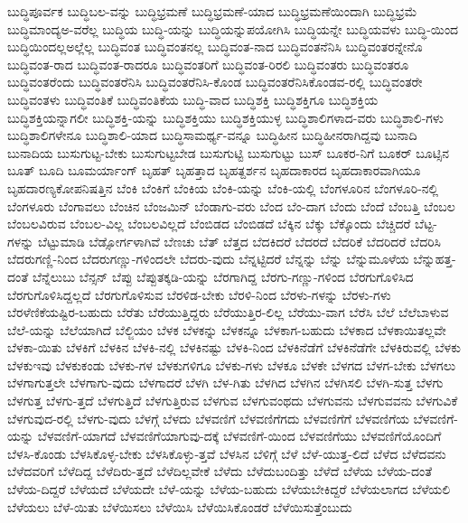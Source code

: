 {ಬುದ್ಧಿಪೂರ್ವಕ
ಬುದ್ಧಿಬಲ-ವನ್ನು
ಬುದ್ಧಿಭ್ರಮಣೆ
ಬುದ್ಧಿಭ್ರಮಣೆ-ಯಾದ
ಬುದ್ಧಿಭ್ರಮಣೆಯಿಂದಾಗಿ
ಬುದ್ಧಿಭ್ರಮೆ
ಬುದ್ಧಿಮಾಂದ್ಯಅ-ವರೆಲ್ಲ
ಬುದ್ಧಿಯ
ಬುದ್ಧಿ-ಯನ್ನು
ಬುದ್ಧಿಯನ್ನುಪಯೋಗಿಸಿ
ಬುದ್ಧಿಯನ್ನೇ
ಬುದ್ಧಿಯವಳು
ಬುದ್ಧಿ-ಯಿಂದ
ಬುದ್ಧಿಯಿಂದಲ್ಲಅಲ್ಲೆಲ್ಲ
ಬುದ್ಧಿವಂತ
ಬುದ್ಧಿವಂತನಲ್ಲ
ಬುದ್ಧಿವಂತ-ನಾದ
ಬುದ್ಧಿವಂತನೆನಿಸಿ
ಬುದ್ಧಿವಂತರನ್ನೇನೊ
ಬುದ್ಧಿವಂತ-ರಾದ
ಬುದ್ಧಿವಂತ-ರಾದರೂ
ಬುದ್ಧಿವಂತರಿಗೆ
ಬುದ್ಧಿವಂತ-ರಿರಲಿ
ಬುದ್ಧಿವಂತರು
ಬುದ್ಧಿವಂತರೂ
ಬುದ್ಧಿವಂತರೆಂದು
ಬುದ್ಧಿವಂತರೆನಿಸಿ
ಬುದ್ಧಿವಂತರೆನಿಸಿ-ಕೊಂಡ
ಬುದ್ಧಿವಂತರೆನಿಸಿಕೊಂಡವ-ರಲ್ಲಿ
ಬುದ್ಧಿವಂತರೇ
ಬುದ್ಧಿವಂತಳು
ಬುದ್ಧಿವಂತಿಕೆ
ಬುದ್ಧಿವಂತಿಕೆಯ
ಬುದ್ಧಿ-ವಾದ
ಬುದ್ಧಿಶಕ್ತಿ
ಬುದ್ಧಿಶಕ್ತಿಗೂ
ಬುದ್ಧಿಶಕ್ತಿಯ
ಬುದ್ಧಿಶಕ್ತಿಯನ್ನಾಗಲೀ
ಬುದ್ಧಿಶಕ್ತಿ-ಯನ್ನು
ಬುದ್ಧಿಶಕ್ತಿಯು
ಬುದ್ಧಿಶಕ್ತಿಯುಳ್ಳ
ಬುದ್ಧಿಶಾಲಿಗಳಾದ-ವರು
ಬುದ್ಧಿಶಾಲಿ-ಗಳು
ಬುದ್ಧಿಶಾಲಿಗಳೇನೂ
ಬುದ್ಧಿಶಾಲಿ-ಯಾದ
ಬುದ್ಧಿಸಾಮರ್ಥ್ಯ-ವನ್ನೂ
ಬುದ್ಧಿಹೀನ
ಬುದ್ಧಿಹೀನರಾಗಿದ್ದವು
ಬುನಾದಿ
ಬುನಾದಿಯ
ಬುಸುಗುಟ್ಟ-ಬೇಕು
ಬುಸುಗುಟ್ಟಬೇಡ
ಬುಸುಗುಟ್ಟಿ
ಬುಸುಗುಟ್ಟು
ಬುಸ್
ಬೂಕರ-ನಿಗೆ
ಬೂಕರ್
ಬೂಟ್ಸಿನ
ಬೂತ್
ಬೂದಿ
ಬೂಮರ್ಯಾಂಗ್
ಬೃಹತ್
ಬೃಹತ್ತಾದ
ಬೃಹತ್ದರ್ಶನ
ಬೃಹದಾಕಾರದ
ಬೃಹದಾಕಾರವಾಗಿಯೂ
ಬೃಹದಾರಣ್ಯಕೋಪನಿಷತ್ತಿನ
ಬೆಂಕಿ
ಬೆಂಕಿಗೆ
ಬೆಂಕಿಯ
ಬೆಂಕಿ-ಯನ್ನು
ಬೆಂಕಿ-ಯಲ್ಲಿ
ಬೆಂಗಳೂರಿನ
ಬೆಂಗಳೂರಿ-ನಲ್ಲಿ
ಬೆಂಗಳೂರು
ಬೆಂಗಾವಲು
ಬೆಂಚಿನ
ಬೆಂಜಮಿನ್
ಬೆಂಡಾಗು-ವರು
ಬೆಂದ
ಬೆಂ-ದಾಗ
ಬೆಂದು
ಬೆಂದೆ
ಬೆಂಬತ್ತಿ
ಬೆಂಬಲ
ಬೆಂಬಲವಿರುವ
ಬೆಂಬಲ-ವಿಲ್ಲ
ಬೆಂಬಲವಿಲ್ಲದೆ
ಬೆಂಬಿಡದ
ಬೆಂಬಿಡದೆ
ಬೆಕ್ಕಿನ
ಬೆಕ್ಕು
ಬೆಕ್ಕೊಂದು
ಬೆಚ್ಚಿದರೆ
ಬೆಟ್ಟ-ಗಳನ್ನು
ಬೆಟ್ಟುಮಾಡಿ
ಬೆಡ್ಸೋರ್ಗಳಾಗಿವೆ
ಬೆಣಚು
ಬೆತ್
ಬೆತ್ತದ
ಬೆದಕಿದರೆ
ಬೆದರದೆ
ಬೆದರಿಕೆ
ಬೆದರಿದರೆ
ಬೆದರಿಸಿ
ಬೆದರುಗಣ್ಣಿ-ನಿಂದ
ಬೆದರುಗಣ್ಣು-ಗಳಿಂದಲೇ
ಬೆದರು-ವುದು
ಬೆನ್ನಟ್ಟಿದರೆ
ಬೆನ್ನನ್ನು
ಬೆನ್ನು
ಬೆನ್ನುಮೂಳೆಯ
ಬೆನ್ನುಹತ್ತ-ದಂತೆ
ಬೆನ್ನೆಲುಬು
ಬೆನ್ಸನ್
ಬೆಪ್ಪು
ಬೆಪ್ಪುತಕ್ಕಡಿ-ಯನ್ನು
ಬೆರಗಾಗಿದ್ದ
ಬೆರಗು-ಗಣ್ಣು-ಗಳಿಂದ
ಬೆರಗುಗೊಳಿಸಿದ
ಬೆರಗುಗೊಳಿಸಿದ್ದಲ್ಲದೆ
ಬೆರಗುಗೊಳಿಸುವ
ಬೆರಳಿಡ-ಬೇಕು
ಬೆರಳಿ-ನಿಂದ
ಬೆರಳು-ಗಳನ್ನು
ಬೆರಳು-ಗಳು
ಬೆರಳೆಣಿಕೆಯಷ್ಟಿರ-ಬಹುದು
ಬೆರೆತು
ಬೆರೆಯುತ್ತಿದ್ದರು
ಬೆರೆಯುತ್ತಿರ-ಲಿಲ್ಲ
ಬೆರೆಯು-ವಾಗ
ಬೆರೆಸಿ
ಬೆಲೆ
ಬೆಲೆಬಾಳುವ
ಬೆಲೆ-ಯನ್ನು
ಬೆಲೆಯಾಗಿದೆ
ಬೆಲ್ಜಿಯಂ
ಬೆಳಕ
ಬೆಳಕನ್ನು
ಬೆಳಕನ್ನೂ
ಬೆಳಕಾಗ-ಬಹುದು
ಬೆಳಕಾದ
ಬೆಳಕಾಯಿತಲ್ಲವೇ
ಬೆಳಕಾ-ಯಿತು
ಬೆಳಕಿಗೆ
ಬೆಳಕಿನ
ಬೆಳಕಿ-ನಲ್ಲಿ
ಬೆಳಕಿನಷ್ಟು
ಬೆಳಕಿ-ನಿಂದ
ಬೆಳಕಿನೆಡೆಗೆ
ಬೆಳಕಿನೆಡೆಗೇ
ಬೆಳಕಿರುವಲ್ಲಿ
ಬೆಳಕು
ಬೆಳಕುಇವು
ಬೆಳಕುಕಂಡು
ಬೆಳಕು-ಗಳ
ಬೆಳಕುಗಳಿಗೂ
ಬೆಳಕು-ಗಳು
ಬೆಳಕೂ
ಬೆಳಕೇ
ಬೆಳಗದ
ಬೆಳಗ-ಬೇಕು
ಬೆಳಗಲು
ಬೆಳಗಾಗುತ್ತಲೇ
ಬೆಳಗಾಗು-ವುದು
ಬೆಳಗಾದರೆ
ಬೆಳಗಿ
ಬೆಳ-ಗಿತು
ಬೆಳಗಿದ
ಬೆಳಗಿನ
ಬೆಳಗಿಸಲಿ
ಬೆಳಗಿ-ಸುತ್ತ
ಬೆಳಗು
ಬೆಳಗುತ್ತ
ಬೆಳಗು-ತ್ತದೆ
ಬೆಳಗುತ್ತಿದೆ
ಬೆಳಗುತ್ತಿರುವ
ಬೆಳಗುವ
ಬೆಳಗುವಂಥದು
ಬೆಳಗುವನು
ಬೆಳಗುವವನು
ಬೆಳಗುವಿಕೆ
ಬೆಳಗುವುದ-ರಲ್ಲಿ
ಬೆಳಗು-ವುದು
ಬೆಳಗ್ಗೆ
ಬೆಳದು
ಬೆಳವಣಿಗೆ
ಬೆಳವಣಿಗೆಗದು
ಬೆಳವಣಿಗೆಗೆ
ಬೆಳವಣಿಗೆಯ
ಬೆಳವಣಿಗೆ-ಯನ್ನು
ಬೆಳವಣಿಗೆ-ಯಾಗದೆ
ಬೆಳವಣಿಗೆಯಾಗುವು-ದಕ್ಕೆ
ಬೆಳವಣಿಗೆ-ಯಿಂದ
ಬೆಳವಣಿಗೆಯು
ಬೆಳವಣಿಗೆಯೊಂದಿಗೆ
ಬೆಳಸಿ-ಕೊಂಡು
ಬೆಳಸಿಕೊಳ್ಳ-ಬೇಕು
ಬೆಳಸಿಕೊಳ್ಳು-ತ್ತವೆ
ಬೆಳಸಿನ
ಬೆಳಿಗ್ಗೆ
ಬೆಳೆ
ಬೆಳೆ-ಯುತ್ತ-ಲಿದೆ
ಬೆಳೆದ
ಬೆಳೆದವನು
ಬೆಳೆದವರಿಗೆ
ಬೆಳೆದಿದ್ದ
ಬೆಳೆದಿರು-ತ್ತದೆ
ಬೆಳೆದಿಲ್ಲವೇಕೆ
ಬೆಳೆದು
ಬೆಳೆದುಬಂದಿತ್ತು
ಬೆಳೆದೆ
ಬೆಳೆಯ
ಬೆಳೆಯ-ದಂತೆ
ಬೆಳೆಯ-ದಿದ್ದರೆ
ಬೆಳೆಯದೆ
ಬೆಳೆಯದೇ
ಬೆಳೆ-ಯನ್ನು
ಬೆಳೆಯ-ಬಹುದು
ಬೆಳೆಯಬೇಕಿದ್ದರೆ
ಬೆಳೆಯಲಾಗದ
ಬೆಳೆಯಲಿ
ಬೆಳೆಯಲು
ಬೆಳೆ-ಯಿತು
ಬೆಳೆಯಿಸಲು
ಬೆಳೆಯಿಸಿ
ಬೆಳೆಯಿಸಿಕೊಂಡರೆ
ಬೆಳೆಯಿಸುತ್ತೆಂಬುದು
}
